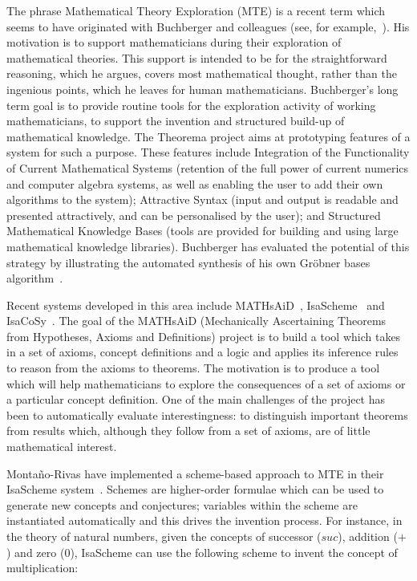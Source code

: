 The phrase Mathematical Theory Exploration (MTE) is a recent term
which seems to have originated with Buchberger and colleagues (see,
for example,~\cite{buchberger}). His motivation is to support
mathematicians during their exploration of mathematical theories. This
support is intended to be for the straightforward reasoning, which he
argues, covers most mathematical thought, rather than the ingenious
points, which he leaves for human mathematicians. Buchberger's long
term goal is to provide routine tools for the exploration activity of
working mathematicians, to support the invention and structured
build-up of mathematical knowledge. The Theorema project aims at
prototyping features of a system for such a purpose. These features
include Integration of the Functionality of Current Mathematical
Systems (retention of the full power of current numerics and computer
algebra systems, as well as enabling the user to add their own
algorithms to the system); Attractive Syntax (input and output is
readable and presented attractively, and can be personalised by the
user); and Structured Mathematical Knowledge Bases (tools are provided
for building and using large mathematical knowledge
libraries). Buchberger has evaluated the potential of this strategy by
illustrating the automated synthesis of his own Gr\"obner bases
algorithm~\cite{buchberger:04}.

Recent systems developed in this area include MATHsAiD~\cite{roy},
IsaScheme~\cite{MontanoRivas2011} and
IsaCoSy~\cite{Johansson.Dixon.Bundy:conjecture-generation}. The goal of the
MATHsAiD (Mechanically Ascertaining Theorems from Hypotheses, Axioms and
Definitions) project is to build a tool which takes in a set of axioms, concept
definitions and a logic and applies its inference rules to reason from the
axioms to theorems. The motivation is to produce a tool which will help
mathematicians to explore the consequences of a set of axioms or a particular
concept definition. One of the main challenges of the project has been to
automatically evaluate interestingness: to distinguish important theorems from
results which, although they follow from a set of axioms, are of little
mathematical interest.

Monta{\~n}o-Rivas \etal{} have implemented a scheme-based approach to MTE in their
IsaScheme system~\cite{MontanoRivas2011}. Schemes are higher-order formulae
which can be used to generate new concepts and conjectures; variables within the
scheme are instantiated automatically and this drives the invention process.
For instance, in the theory of natural numbers, given the concepts of successor
($suc$), addition ($+$) and zero ($0$), IsaScheme can use the following scheme
to invent the concept of multiplication:

